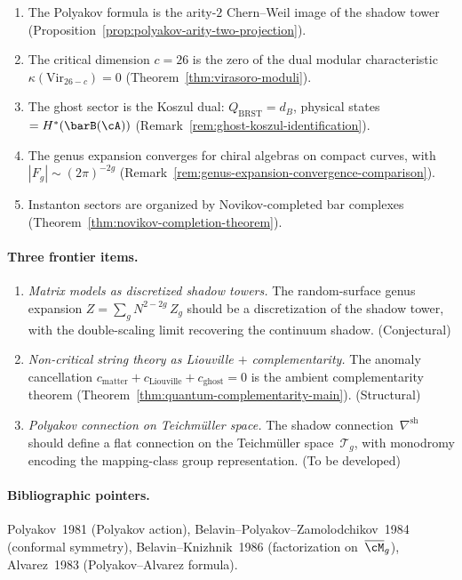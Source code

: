 \begin{enumerate}[label=\textup{(\roman*)}]
\item The Polyakov formula is the arity-$2$ Chern--Weil image
  of the shadow tower
  (Proposition~\ref{prop:polyakov-arity-two-projection}).
\item The critical dimension $c = 26$ is the zero of the dual
  modular characteristic
  $\kappa(\mathrm{Vir}_{26-c}) = 0$
  (Theorem~\ref{thm:virasoro-moduli}).
\item The ghost sector is the Koszul dual:
  $Q_{\mathrm{BRST}} = d_B$, physical states
  $= H^*(\barB(\cA))$
  (Remark~\ref{rem:ghost-koszul-identification}).
\item The genus expansion converges for chiral algebras on
  compact curves, with $|F_g| \sim (2\pi)^{-2g}$
  (Remark~\ref{rem:genus-expansion-convergence-comparison}).
\item Instanton sectors are organized by Novikov-completed
  bar complexes
  (Theorem~\ref{thm:novikov-completion-theorem}).
\end{enumerate}

\paragraph{Three frontier items.}

\begin{enumerate}[label=\textup{(\alph*)}]
\item \emph{Matrix models as discretized shadow towers.}
  The random-surface genus expansion
  $Z = \sum_g N^{2-2g}\,Z_g$ should be a discretization of
  the shadow tower, with the double-scaling limit recovering
  the continuum shadow.
  \hfill\textup{(Conjectural)}
\item \emph{Non-critical string theory as Liouville $+$
  complementarity.}
  The anomaly cancellation
  $c_{\mathrm{matter}} + c_{\mathrm{Liouville}} +
  c_{\mathrm{ghost}} = 0$
  is the ambient complementarity theorem
  (Theorem~\ref{thm:quantum-complementarity-main}).
  \hfill\textup{(Structural)}
\item \emph{Polyakov connection on Teichm\"uller space.}
  The shadow connection~$\nabla^{\mathrm{sh}}$ should define a
  flat connection on the Teichm\"uller space~$\mathcal{T}_g$,
  with monodromy encoding the mapping-class group
  representation.
  \hfill\textup{(To be developed)}
\end{enumerate}

\paragraph{Bibliographic pointers.}
Polyakov~1981 (Polyakov action),
Belavin--Polyakov--Zamolodchikov~1984 (conformal symmetry),
Belavin--Knizhnik~1986 (factorization on~$\overline{\cM}_g$),
Alvarez~1983 (Polyakov--Alvarez formula).

